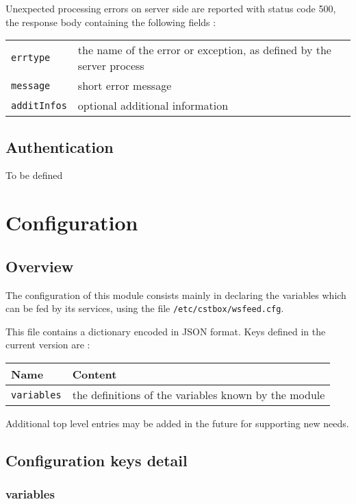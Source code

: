 \documentclass[11pt,a4paper]{article}
\begin{document}
Unexpected processing errors on server side are reported with status code 500, the response 
body containing the following fields :

\begin{tabularx}{\textwidth}{lX}
\texttt{errtype} & the name of the error or exception, as defined by the server process\\
\texttt{message} & short error message \\
\texttt{additInfos} & optional additional information\\
\end{tabularx}

\subsection{Authentication}

To be defined

\section{Configuration}

\subsection{Overview}
The configuration of this module consists mainly in declaring the variables which can be fed 
by its services, using the file \texttt{/etc/cstbox/wsfeed.cfg}. 

This file contains a dictionary encoded in JSON format. Keys defined in the current version 
are :

\begin{tabularx}{\textwidth}{lX}
\textbf{Name} & \textbf{Content} \\
\midrule
\texttt{variables} & the definitions of the variables known by the module
\end{tabularx}

Additional top level entries may be added in the future for supporting new needs.

\subsection{Configuration keys detail}

\subsubsection{variables}
\label{sec:cfg-variables}
\end{document}
